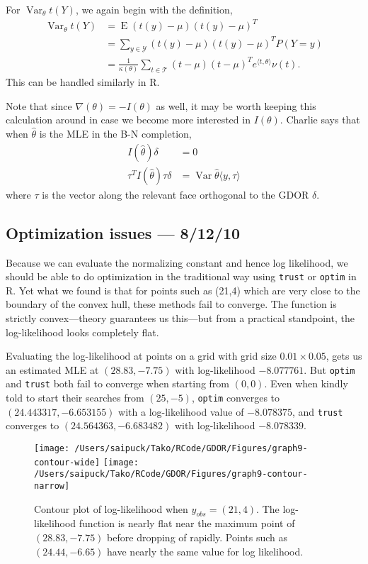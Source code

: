 \documentclass{amsbook}
\DeclareMathOperator{\E}{E}
\DeclareMathOperator{\Var}{Var}
\def\YY{{\mathcal Y}}
\def\TT{{\mathcal T}}
\newcommand{\inner}[1]{\langle #1 \rangle}
\theoremstyle{definition}
\theoremstyle{remark}
\begin{document}
For $\Var_\theta t(Y)$, we again begin with the definition, 
\begin{align*}
\Var_\theta t(Y) &= \E (t(y) - \mu)( t(y) - \mu)^T \\
				&= \sum_{y \in \YY} (t(y) - \mu)( t(y) - \mu)^T P(Y=y)\\
				&= \frac{1}{\kappa(\theta)} \sum_{t\in \TT}
					(t - \mu)( t - \mu)^T e^{\inner{t,\theta}} \nu(t).
\end{align*}
This can be handled similarly in R.

Note that since $\nabla(\theta) = - I(\theta)$ as well, it may be worth keeping this 
calculation around in case we become more interested in $I(\theta)$.
Charlie says that when $\hat{\theta}$ is the MLE in the B-N completion,
\begin{align*}
	I(\hat{\theta}) \delta &= 0 \\
	\tau^T I(\hat{\theta}) \tau \delta &= \Var{\hat{\theta}}\inner{y, \tau}
\end{align*}
where $\tau$ is the vector along the relevant face orthogonal to the GDOR $\delta$.

\subsection{Optimization issues --- 8/12/10}
Because we can evaluate the normalizing constant and hence log likelihood, we should be able to do optimization in 
the traditional way using \texttt{trust} or \texttt{optim} in R.  Yet what we found is 
that for points such as (21,4) which are very close to the boundary of the convex hull, 
these methods fail to converge.  The function is strictly convex---theory guarantees us 
this---but from a practical standpoint, the log-likelihood looks completely flat.  

Evaluating the log-likelihood at points on a grid with grid size $0.01 \times 0.05$, gets us 
an estimated MLE at $(28.83, -7.75)$ with log-likelihood $-8.077761$.  But \texttt
{optim} and \texttt{trust} both fail to converge when starting from $(0,0)$.   Even 
when kindly told to start their searches from $(25, -5)$, \texttt{optim} converges to $
(24.443317, -6.653155)$ with a log-likelihood value of $-8.078375$, and \texttt{trust} 
converges to $(24.564363, -6.683482)$ with log-likelihood $-8.078339$.  
\begin{figure}[!h]
\centering
\texttt{[image: /Users/saipuck/Tako/RCode/GDOR/Figures/graph9-contour-wide]}
\texttt{[image: /Users/saipuck/Tako/RCode/GDOR/Figures/graph9-contour-narrow]}
\caption{Contour plot of log-likelihood when $y_{obs} = (21,4)$.  The log-likelihood 
function is nearly flat near the maximum point of $(28.83, -7.75)$ before dropping of 
rapidly.  Points such as $(24.44, -6.65)$ have nearly the same value for log
likelihood. }
\end{figure}
\end{document}
